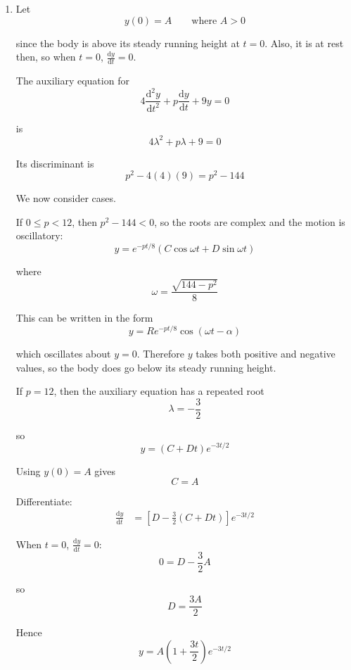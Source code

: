 \documentclass[leqno]{article}
\begin{document}
\begin{enumerate}[
  label=\textbf{\arabic*.},
  leftmargin=*,
  topsep=0pt,
  partopsep=0pt,
  parsep=0pt
]
\begin{djsSolution}
\begin{enumerate}[label=\textbf{(\alph*)}]
\begin{enumerate}[label=(\roman*)]
    So the motion is simple harmonic when $p=0$.

    \item In a real car suspension there is damping, due to shock absorbers and friction, so energy is lost and the amplitude decreases with time. Pure simple harmonic motion would have constant amplitude, so it is unlikely to be realistic.
  \end{enumerate}

  \item Let
  \[
  y(0)=A \qquad \text{where } A>0
  \]

  since the body is above its steady running height at $t=0$. Also, it is at rest then, so when $t=0$, $\frac{\mathrm{d}y}{\mathrm{d}t}=0$.

  The auxiliary equation for
  \[
  4\frac{\mathrm{d}^2y}{\mathrm{d}t^2}+p\frac{\mathrm{d}y}{\mathrm{d}t}+9y=0
  \]

  is
  \[
  4\lambda^2+p\lambda+9=0
  \]

  Its discriminant is
  \[
  p^2-4(4)(9)=p^2-144
  \]

  We now consider cases.

  If $0\le p<12$, then $p^2-144<0$, so the roots are complex and the motion is oscillatory:
  \[
  y=e^{-pt/8}\left(C\cos \omega t+D\sin \omega t\right)
  \]

  where
  \[
  \omega=\frac{\sqrt{144-p^2}}{8}
  \]

  This can be written in the form
  \[
  y=Re^{-pt/8}\cos(\omega t-\alpha)
  \]

  which oscillates about $y=0$. Therefore $y$ takes both positive and negative values, so the body does go below its steady running height.

  If $p=12$, then the auxiliary equation has a repeated root
  \[
  \lambda=-\frac{3}{2}
  \]

  so
  \[
  y=(C+Dt)e^{-3t/2}
  \]

  Using $y(0)=A$ gives
  \[
  C=A
  \]

  Differentiate:
  \begin{align*}
  \frac{\mathrm{d}y}{\mathrm{d}t}
  &=\left[D-\frac{3}{2}(C+Dt)\right]e^{-3t/2}
  \end{align*}

  When $t=0$, $\frac{\mathrm{d}y}{\mathrm{d}t}=0$:
  \[
  0=D-\frac{3}{2}A
  \]

  so
  \[
  D=\frac{3A}{2}
  \]

  Hence
  \[
  y=A\left(1+\frac{3t}{2}\right)e^{-3t/2}
  \]


\end{enumerate}
\end{djsSolution}
\end{enumerate}
\end{document}
